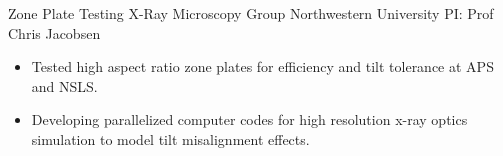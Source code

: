 

        {Zone Plate Testing}
        {\newline X-Ray Microscopy Group}
        {Northwestern University}
        {PI: Prof Chris Jacobsen}{
    \begin{itemize}
		\item Tested high aspect ratio zone plates for efficiency and tilt tolerance at APS and NSLS.
		\item Developing parallelized computer codes for high resolution x-ray optics simulation to model tilt misalignment effects.
    \end{itemize}
	}

